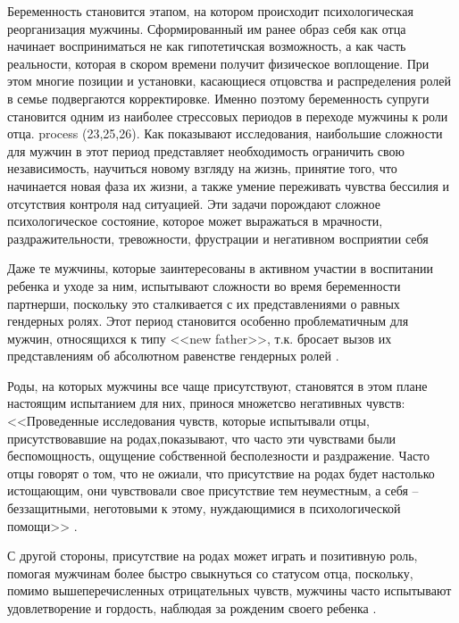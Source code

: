 \documentclass{../../common/thesisbyxetex}
\begin{document}
Беременность становится этапом, на котором происходит психологическая реорганизация мужчины.
Сформированный им ранее образ себя как отца начинает восприниматься не как гипотетичская
возможность, а как часть реальности, которая в скором времени получит физическое воплощение. При
этом многие позиции и установки, касающиеся отцовства и распределения ролей в семье подвергаются
корректировке. Именно поэтому беременность супруги становится одним из наиболее стрессовых периодов
в переходе мужчины к роли отца. process (23,25,26). Как показывают исследования, наибольшие
сложности для мужчин в этот период представляет необходимость ограничить свою независимость,
научиться новому взгляду на жизнь, принятие того, что начинается новая фаза их жизни, а также
умение  переживать чувства бессилия и отсутствия контроля над ситуацией. Эти задачи порождают
сложное  психологическое состояние, которое может выражаться в мрачности, раздражительности,
тревожности, фрустрации и негативном восприятии себя  \cite[314]{flit}


Даже те мужчины, которые заинтересованы в активном участии в воспитании ребенка и уходе за ним,
испытывают сложности во время беременности партнерши, поскольку это сталкивается с их
представлениями о равных гендерных ролях. Этот период становится особенно проблематичным для
мужчин, относящихся к типу <<new father>>, т.к. бросает вызов их представлениям об абсолютном
равенстве гендерных ролей \cite[20]{long}.

Роды, на которых мужчины все чаще присутствуют, становятся в этом плане настоящим испытанием
для них, принося множетсво негативных чувств: <<Проведенные исследования чувств, которые
испытывали отцы, присутствовавшие на родах,показывают, что часто эти чувствами были
беспомощность, ощущение собственной бесполезности и раздражение. Часто отцы говорят о том,
что не ожиали, что присутствие на родах будет настолько истощающим, они чувствовали свое
присутствие тем неуместным, а себя -- беззащитными, неготовыми к этому, нуждающимися в
психологической помощи>> \cite[313]{flit}.

С другой стороны, присутствие на родах может играть и позитивную роль, помогая мужчинам более
быстро свыкнуться со статусом отца, поскольку, помимо вышеперечисленных отрицательных чувств,
мужчины часто испытывают удовлетворение и гордость, наблюдая за рожденим своего ребенка
\cite[314]{flit}.







\end{document}
